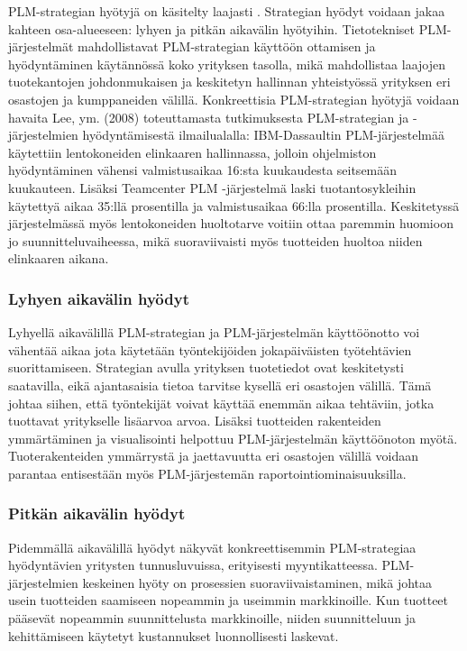 PLM-strategian hyötyjä on käsitelty laajasti  \cite{alemanni_key_2008}  \cite{rivest_product_2012}. Strategian hyödyt voidaan jakaa kahteen osa-alueeseen: lyhyen ja pitkän aikavälin hyötyihin. Tietotekniset PLM-järjestelmät mahdollistavat PLM-strategian käyttöön ottamisen ja hyödyntäminen käytännössä koko yrityksen tasolla, mikä mahdollistaa laajojen tuotekantojen johdonmukaisen ja keskitetyn hallinnan yhteistyössä yrityksen eri osastojen ja kumppaneiden välillä. Konkreettisia PLM-strategian hyötyjä voidaan havaita Lee, ym. (2008) toteuttamasta tutkimuksesta PLM-strategian ja -järjestelmien hyödyntämisestä ilmailualalla: IBM-Dassaultin PLM-järjestelmää käytettiin lentokoneiden elinkaaren hallinnassa, jolloin ohjelmiston hyödyntäminen vähensi valmistusaikaa 16:sta kuukaudesta seitsemään kuukauteen. Lisäksi Teamcenter PLM -järjestelmä laski tuotantosykleihin käytettyä aikaa 35:llä prosentilla ja valmistusaikaa 66:lla prosentilla. Keskitetyssä järjestelmässä myös lentokoneiden huoltotarve voitiin ottaa paremmin huomioon jo suunnitteluvaiheessa, mikä suoraviivaisti myös tuotteiden huoltoa niiden elinkaaren aikana.  \cite{lee_product_2008}

\subsubsection{Lyhyen aikavälin hyödyt} \label{Lyhyen aikavälin hyödyt}

Lyhyellä aikavälillä PLM-strategian ja PLM-järjestelmän käyttöönotto voi vähentää aikaa jota käytetään työntekijöiden jokapäiväisten työtehtävien suorittamiseen. Strategian avulla yrityksen tuotetiedot ovat keskitetysti saatavilla, eikä ajantasaisia tietoa tarvitse kysellä eri osastojen välillä. Tämä johtaa siihen, että työntekijät voivat käyttää enemmän aikaa tehtäviin, jotka tuottavat yritykselle lisäarvoa arvoa. Lisäksi tuotteiden rakenteiden ymmärtäminen ja visualisointi helpottuu PLM-järjestelmän käyttöönoton myötä. Tuoterakenteiden ymmärrystä ja jaettavuutta eri osastojen välillä voidaan parantaa entisestään myös PLM-järjestemän raportointiominaisuuksilla.  \cite{alemanni_key_2008}

\subsubsection{Pitkän aikavälin hyödyt} \label{Pitkän aikavälin hyödyt}

Pidemmällä aikavälillä hyödyt näkyvät konkreettisemmin PLM-strategiaa hyödyntävien yritysten tunnusluvuissa, erityisesti myyntikatteessa. PLM-järjestelmien keskeinen hyöty on prosessien suoraviivaistaminen, mikä johtaa usein tuotteiden saamiseen nopeammin ja useimmin markkinoille. Kun tuotteet pääsevät nopeammin suunnittelusta markkinoille, niiden suunnitteluun ja kehittämiseen käytetyt kustannukset luonnollisesti laskevat.  \cite{bouhaddou_plm_2012}  \cite{alemanni_key_2008}

